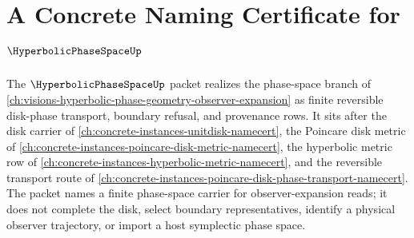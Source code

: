 \chapter{A Concrete Naming Certificate for $\HyperbolicPhaseSpaceUp$}
\label{ch:concrete-instances-hyperbolic-phase-space-namecert}

The $\HyperbolicPhaseSpaceUp$ packet realizes the phase-space branch of \autoref{ch:visions-hyperbolic-phase-geometry-observer-expansion} as finite reversible disk-phase transport, boundary refusal, and provenance rows. It sits after the disk carrier of \autoref{ch:concrete-instances-unitdisk-namecert}, the Poincare disk metric of \autoref{ch:concrete-instances-poincare-disk-metric-namecert}, the hyperbolic metric row of \autoref{ch:concrete-instances-hyperbolic-metric-namecert}, and the reversible transport route of \autoref{ch:concrete-instances-poincare-disk-phase-transport-namecert}. The packet names a finite phase-space carrier for observer-expansion reads; it does not complete the disk, select boundary representatives, identify a physical observer trajectory, or import a host symplectic phase space.

